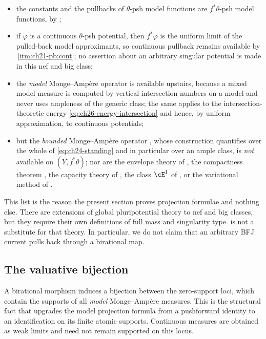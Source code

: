 \begin{itemize}
\item the constants and the pullbacks of \(\theta\)-psh model functions are
\(f^*\theta\)-psh model functions, by
;
\item if \(\varphi\) is a continuous \(\theta\)-psh potential, then
\(f^*\varphi\) is the uniform limit of the pulled-back model approximants,
so continuous pullback remains available by
\,\cref{itm:ch21-pb:cont}; no assertion about an
arbitrary singular potential is made in this nef and big class;
\item the \emph{model} Monge--Amp\`ere operator is available upstairs,
because a mixed model measure is computed by vertical intersection numbers
on a model and never uses ampleness of the generic class; the same applies
to the intersection-theoretic energy \eqref{eq:ch26-energy-intersection} and
hence, by uniform approximation, to continuous potentials;
\item but the \emph{bounded} Monge--Amp\`ere operator
, whose construction quantifies over the
whole of \eqref{eq:ch24-standing} and in particular over an ample class, is
\emph{not} available on \((Y,f^*\theta)\); nor are the envelope theory of
, the compactness theorem
, the capacity theory of
, the class \(\cE^1\) of , or
the variational method of
.
\end{itemize}

This list is the reason the present section proves projection formulae and
nothing else.  There are extensions of global pluripotential theory to nef
and big classes, but they require their own definitions of full mass and
singularity type.   is not a
substitute for that theory.  In particular, we do not claim that an
arbitrary BFJ current pulls back through a birational map.

\subsection{The valuative bijection}
\label{sec:ch30-birational-bijection}

A birational morphism induces a bijection between the zero-support loci,
which contain the supports of all \emph{model} Monge--Amp\`ere measures.
This is the structural fact that upgrades the model projection formula from
a pushforward identity to an identification on its finite atomic supports.
Continuous measures are obtained as weak limits and need not remain
supported on this locus.

